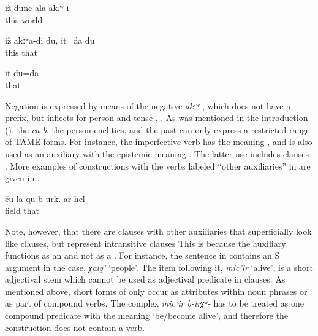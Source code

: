 \begin{exe}
	\ex	\label{ex:‎‎This world was not yours}
	\gll	iž	dune	ala	akːʷ-i\\
		this	world		\\
	\glt	{}
	
	\ex	\label{ex:‎‎‎This is not me, that is me}
	\gll	iž	akːʷa-di	du,	it=da	du\\
		this			that	\\
	\glt	{}

	\ex	\label{ex:That is me}
	\gll	it	du=da\\
		that	\\
	\glt	{}
\end{exe}

Negation is expressed by means of the negative  \textit{akːʷ-}, which does not have a  prefix, but inflects for person and tense , . As was mentioned in the introduction (), the  \textit{ca-b}, the person enclitics, and the past  can only express a restricted range of TAME forms. For instance, the imperfective verb  has the meaning , and is also used as an auxiliary with the epistemic meaning . The latter use includes  clauses . More examples of  constructions with the verbs labeled ``other auxiliaries'' in  are given in .

 \begin{exe}
 \ex	\label{That is probably their field.}
\gll ču-la	qu	b-urkː-ar	hel	\\
	field		that	\\
 \glt	{}
\end{exe}

Note, however, that there are clauses with other auxiliaries that superficially look like  clauses, but represent intransitive clauses This is because the auxiliary functions as an  and not as a . For instance, the sentence in  contains an S argument in the  case, \textit{χalq'} `people'. The item following it, \textit{mic'ir} `alive', is a short adjectival stem which cannot be used as adjectival predicate in  clauses. As mentioned above, short forms of  only occur as attributes within noun phrases or as part of compound verbs. The complex  \textit{mic'ir	b-irχʷ-} has to be treated as one compound predicate with the meaning `be\slash become alive', and therefore the construction does not contain a  verb.
 

